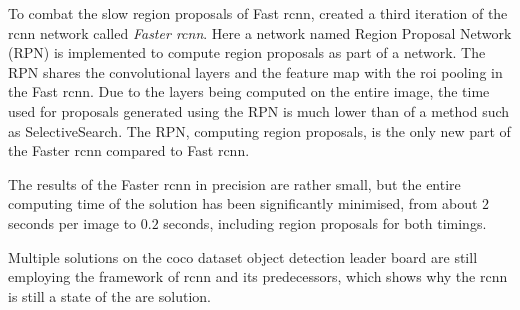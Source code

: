To combat the slow region proposals of Fast \gls{rcnn}, \cite{Ren2017} created a third iteration of the \gls{rcnn} network called \textit{Faster \gls{rcnn}}. Here a network named Region Proposal Network (RPN) is implemented to compute region proposals as part of a  network. The RPN shares the convolutional layers and the feature map with the \gls{roi} pooling in the Fast \gls{rcnn}. Due to the layers being computed on the entire image, the time used for proposals generated using the RPN is much lower than of a method such as SelectiveSearch. The RPN, computing region proposals, is the only new part of the Faster \gls{rcnn} compared to Fast \gls{rcnn}.

The results of the Faster \gls{rcnn} in precision are rather small, but the entire computing time of the solution has been significantly minimised, from about $2$ seconds per image to $0.2$ seconds, including region proposals for both timings.

Multiple solutions on the \gls{coco} dataset object detection leader board are still employing the framework of \gls{rcnn} and its predecessors, which shows why the \gls{rcnn} is still a state of the are solution.

